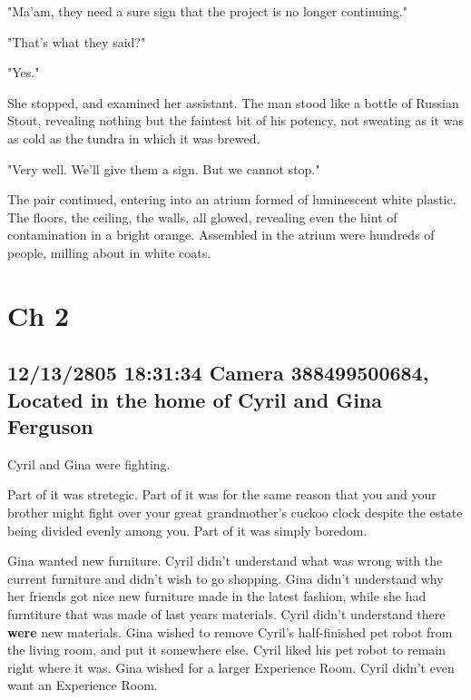 \documentclass[12pt]{book}
\begin{document}
"Ma'am, they need a sure sign that the project is no longer continuing."

"That's what they said?"

"Yes."

She stopped, and examined her assistant. The man stood like a bottle of Russian Stout, revealing nothing but the faintest bit of his potency, not sweating as it was as cold as the tundra in which it was brewed.

"Very well. We'll give them a sign. But we cannot stop."

The pair continued, entering into an atrium formed of luminescent white plastic. The floors, the ceiling, the walls, all glowed, revealing even the hint of contamination in a bright orange. Assembled in the atrium were hundreds of people, milling about in white coats. 
\chapter*{Ch 2}
\label{sec:org21a7a55}

\section*{12/13/2805 18:31:34 Camera 388499500684, Located in the home of Cyril and Gina Ferguson}
\label{sec:org84fa74b}

Cyril and Gina were fighting. 

Part of it was stretegic. Part of it was for the same reason that you and your brother might fight over your great grandmother's cuckoo clock despite the estate being divided evenly among you. Part of it was simply boredom.

Gina wanted new furniture. Cyril didn't understand what was wrong with the current furniture and didn't wish to go shopping. Gina didn't understand why her friends got nice new furniture made in the latest fashion, while she had furntiture that was made of last years materials. Cyril didn't understand there \textbf{were} new materials. Gina wished to remove Cyril's half-finished pet robot from the living room, and put it somewhere else. Cyril liked his pet robot to remain right where it was. Gina wished for a larger Experience Room. Cyril didn't even want an Experience Room.
\end{document}
